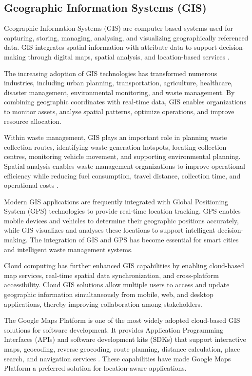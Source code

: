 \subsection{Geographic Information Systems (GIS)}

Geographic Information Systems (GIS) are computer-based systems used for
capturing, storing, managing, analysing, and visualizing geographically referenced
data. GIS integrates spatial information with attribute data to support
decision-making through digital maps, spatial analysis, and location-based
services \citep{longley2021}.

The increasing adoption of GIS technologies has transformed numerous
industries, including urban planning, transportation, agriculture, healthcare,
disaster management, environmental monitoring, and waste management. By
combining geographic coordinates with real-time data, GIS enables organizations
to monitor assets, analyse spatial patterns, optimize operations, and improve
resource allocation.

Within waste management, GIS plays an important role in planning waste
collection routes, identifying waste generation hotspots, locating collection
centres, monitoring vehicle movement, and supporting environmental planning.
Spatial analysis enables waste management organizations to improve operational
efficiency while reducing fuel consumption, travel distance, collection time, and
operational costs \citep{ananth2022}.

Modern GIS applications are frequently integrated with Global Positioning
System (GPS) technologies to provide real-time location tracking. GPS enables
mobile devices and vehicles to determine their geographic positions accurately,
while GIS visualizes and analyses these locations to support intelligent
decision-making. The integration of GIS and GPS has become essential for smart
cities and intelligent waste management systems.

Cloud computing has further enhanced GIS capabilities by enabling cloud-based
map services, real-time spatial data synchronization, and cross-platform
accessibility. Cloud GIS solutions allow multiple users to access and update
geographic information simultaneously from mobile, web, and desktop
applications, thereby improving collaboration among stakeholders.

The Google Maps Platform is one of the most widely adopted cloud-based GIS
solutions for software development. It provides Application Programming
Interfaces (APIs) and software development kits (SDKs) that support interactive
maps, geocoding, reverse geocoding, route planning, distance calculation, place
search, and navigation services \citep{google2026maps}. These capabilities have
made Google Maps Platform a preferred solution for location-aware applications.

